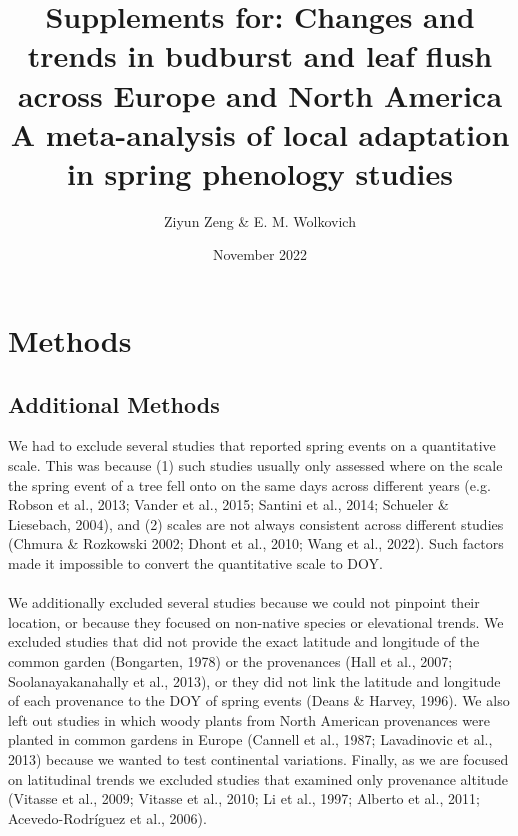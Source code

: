 \documentclass{article}
\begin{document}
\title{{\huge Supplements for: Changes and trends in budburst and leaf flush across Europe and North America} \\A meta-analysis of local adaptation in spring phenology studies}
\author{Ziyun Zeng \& E. M. Wolkovich}
\date{November 2022}
\maketitle 


\section*{Methods}

\subsection*{Additional Methods}
We had to exclude several studies that reported spring events on a quantitative scale. This was because (1) such studies usually only assessed where on the scale the spring event of a tree fell onto on the same days across different years (e.g. Robson et al., 2013; Vander et al., 2015; Santini et al., 2014; Schueler \& Liesebach, 2004), and (2) scales are not always consistent across different studies (Chmura \& Rozkowski 2002; Dhont et al., 2010; Wang et al., 2022). Such factors made it impossible to convert the quantitative scale to DOY.
\\
\\
We additionally excluded several studies because we could not pinpoint their location, or because they focused on non-native species or elevational trends. We excluded studies that did not provide the exact latitude and longitude of the common garden (Bongarten, 1978) or the provenances (Hall et al., 2007; Soolanayakanahally et al., 2013), or they did not link the latitude and longitude of each provenance to the DOY of spring events (Deans \& Harvey, 1996). We also left out studies in which woody plants from North American provenances were planted in common gardens in Europe (Cannell et al., 1987; Lavadinovic et al., 2013) because we wanted to test continental variations. Finally, as we are focused on latitudinal trends we excluded studies that examined only provenance altitude (Vitasse et al., 2009; Vitasse et al., 2010; Li et al., 1997; Alberto et al., 2011; Acevedo-Rodríguez et al., 2006). 
\end{document}
